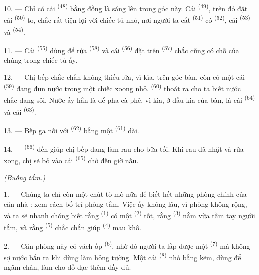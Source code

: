 10. --- Chỉ có cái  \textsuperscript{(48)} bằng đồng là sáng lên trong
góc này. Cái  \textsuperscript{(49)}, trên đó đặt cái 
\textsuperscript{(50)} to, chắc rất tiện lợi với chiếc tủ nhỏ, nơi người ta cất
 \textsuperscript{(51)} có  \textsuperscript{(52)}, cái
 \textsuperscript{(53)} và  \textsuperscript{(54)}.

\VUsaut{4.0mm}
\VUsaut{3.0mm}

11. --- Cái  \textsuperscript{(55)} dùng để rửa 
\textsuperscript{(58)} và cái  \textsuperscript{(56)} đặt trên
 \textsuperscript{(57)} chắc cũng có chỗ của chúng trong chiếc tủ ấy.

12. --- Chị bếp chắc chắn không thiếu lửa, vì kìa, trên góc bàn, còn có một cái
 \textsuperscript{(59)} đang đun nước trong một chiếc xoong nhỏ.
 \textsuperscript{(60)} thoát ra cho ta biết nước chắc đang sôi. Nước ấy
hẳn là để pha cà phê, vì kìa, ở đầu kia của bàn, là cái 
\textsuperscript{(64)} và cái  \textsuperscript{(63)}.

13. --- Bếp ga nối với  \textsuperscript{(62)} bằng một  \textsuperscript{(61)} dài.

14. ---  \textsuperscript{(66)} đến giúp chị bếp đang
làm rau cho bữa tối. Khi rau đã nhặt và rửa xong, chị sẽ bỏ vào cái 
\textsuperscript{(65)} chờ đến giờ nấu.

\VUsaut{4.0mm}
{\centering\fontsize{10.2pt}{10.2pt}\selectfont{} \textit{(Buồng tắm.)}\par}
\VUsaut{3.0mm}

1. --- Chúng ta chỉ còn một chút tò mò nữa để biết hết những phòng chính của căn nhà :
xem cách bố trí phòng tắm. Việc ấy không lâu, vì phòng không rộng, và ta sẽ nhanh chóng
biết rằng  \textsuperscript{(1)} có một 
\textsuperscript{(2)} tốt, rằng  \textsuperscript{(3)} nằm vừa
tầm tay người tắm, và rằng  \textsuperscript{(5)} chắc chắn giúp
 \textsuperscript{(4)} mau khô.

2. --- Căn phòng này có vách ốp  \textsuperscript{(6)}, nhờ đó người ta
lắp được một  \textsuperscript{(7)} mà không sợ nước bắn ra khi dùng làm
hỏng tường. Một cái  \textsuperscript{(8)} nhỏ bằng kẽm, dùng để ngâm chân,
làm cho đồ đạc thêm đầy đủ.
\VUsaut{6.0mm}
\VUfilet{22mm}
